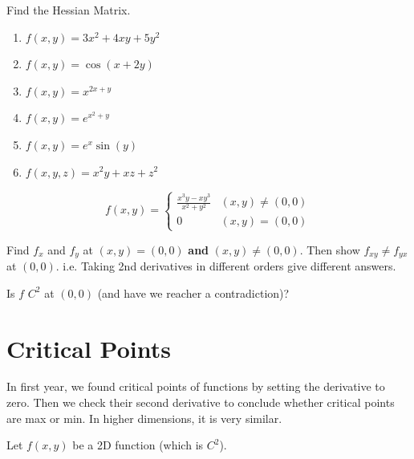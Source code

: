 \documentclass[11pt,fleqn]{book} %
\begin{document}
\begin{exercise}
    Find the Hessian Matrix.

    \begin{minipage}[t]{0.45\linewidth} 
        \begin{enumerate}
            \item $f(x, y) = 3x^2 + 4xy + 5y^2$
            \item $f(x, y) = \cos(x + 2y)$
            \item $f(x, y) = x^{2x + y}$
        \end{enumerate}
    \end{minipage}
    \begin{minipage}[t]{0.45\linewidth} 
        \begin{enumerate} \setcounter{enumi}{3}
            \item $f(x, y) = e^{x^2 + y}$
            \item $f(x, y) = e^x \sin(y)$
            \item $f(x, y, z) = x^2y + xz + z^2$
        \end{enumerate}
    \end{minipage}
\end{exercise}

\begin{exercise}
    $$f(x, y) = \begin{cases}
        \frac{x^3y - xy^3}{x^2 + y^2} & (x, y) \neq (0, 0) \\
        0                             & (x, y) = (0, 0)
    \end{cases}$$

    Find $f_x$ and $f_y$ at $(x, y) = (0, 0)$ \textbf{and} $(x, y) \neq (0, 0)$. Then show $f_{xy} \neq f_{yx}$ at $(0, 0)$. i.e. Taking 2nd derivatives in different orders give different answers. 

    Is $f$ $C^2$ at $(0, 0)$ (and have we reacher a contradiction)?
\end{exercise}

\section{Critical Points}

In first year, we found critical points of functions by setting the derivative to zero. Then we check their second derivative to conclude whether critical points are max or min. In higher dimensions, it is very similar.

Let $f(x, y)$ be a 2D function (which is $C^2$).
\end{document}
